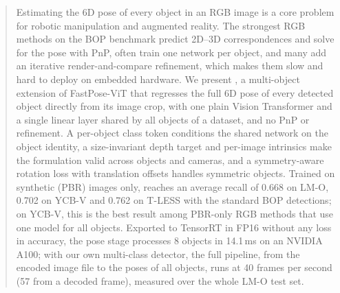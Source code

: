 \begin{abstract}
Estimating the 6D pose of every object in an RGB image is a core problem for robotic
manipulation and augmented reality. The strongest RGB methods on the BOP benchmark predict 2D--3D
correspondences and solve for the pose with PnP, often train one network per object, and many add
an iterative render-and-compare refinement, which makes them slow and hard to deploy on embedded
hardware. We present \ours{}, a multi-object extension of FastPose-ViT that regresses the full 6D
pose of every detected object directly from its image crop, with one plain Vision Transformer
and a single linear layer shared by all objects of a dataset, and no PnP or refinement. A
per-object class token conditions the shared network on the object identity, a size-invariant
depth target and per-image intrinsics make the formulation valid across objects and cameras, and a
symmetry-aware rotation loss with translation offsets handles symmetric objects. Trained on
synthetic (PBR) images only, \ours{} reaches an average recall of 0.668 on LM-O, 0.702 on
YCB-V and 0.762 on T-LESS with the standard BOP detections; on YCB-V, this is the best result among PBR-only RGB
methods that use one model for all objects. Exported to TensorRT in FP16 without any loss in accuracy, the pose stage processes 8
objects in 14.1\,ms on an NVIDIA A100; with our own multi-class detector, the full pipeline, from the
encoded image file to the poses of all objects, runs at 40 frames per second (57 from a decoded
frame), measured over the whole LM-O test set.
\end{abstract}
